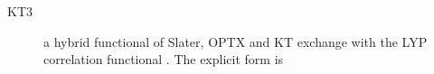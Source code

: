 \begin{description}
\begin{description}
\item[KT3] a hybrid functional of Slater, OPTX and KT exchange with the
  LYP correlation functional \cite{dft:kt3}. The explicit form is











\end{description}
\end{description}

